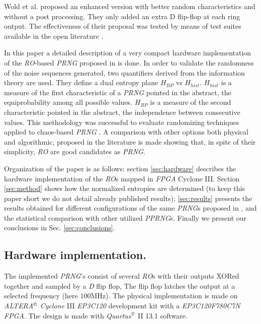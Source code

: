 Wold et al. \cite{Wold2009} proposed an enhanced version with
better random characteristics and without a post processing. They only
added an extra D flip-flop at each ring output. The
effectiveness of their proposal was tested by means of test suites available
in the open literature \cite{NIST2000,marsaglia1995,NIST2000a}.

In this paper a detailed description of a very compact hardware implementation of the \emph{RO}-based \emph{PRNG} proposed in \cite{Wold2009} is done.
In order to validate the randomness of the noise sequences generated, two quantifiers derived from the information theory are used. They define a dual entropy plane $H_{BP}$ vs $H_{hist}$.
$H_{hist}$ is a measure of the first characteristic of a \emph{PRNG} pointed in the abstract, the equiprobability among all possible values. $H_{BP}$ is a measure of the second characteristic pointed in the abstract, the independence between consecutive values. This methodology was successful to evaluate randomizing
techniques applied to chaos-based \emph{PRNG} \cite{DeMicco2008}. A comparison with other options both physical and algorithmic, proposed in the literature is made showing that, in spite of their simplicity, \emph{RO}  are good candidates as \emph{PRNG}.

Organization of the paper is as follows: section \ref{sec:hardware} describes the
hardware implementation of the \emph{RO}s mapped in
\emph{FPGA} Cyclone III. Section \ref{sec:method} shows how the normalized entropies are
determined (to keep this paper short we do not detail already
published results); \ref{sec:results} presents the
results obtained for different configurations of the same
\emph{PRNG}s proposed in \cite{Wold2009}, and the statistical comparison with other utilized \emph{PPRNG}s.
Finally we present our conclusions in Sec. \ref{sec:conclusions}.


\subsection{Hardware implementation.}

The implemented \emph{PRNG}'s consist of  several \emph{RO}s
with their outputs XORed together and sampled by a \emph{D} flip flop,
The flip flop latches the output at a selected frequency (here $100$MHz)\cite{Wold2009}.
The physical implementation is made on \emph{ALTERA}$^{\copyright}$  \emph{Cyclone} III \emph{EP3C120}
development kit with a \emph{EP3C120F780C7N} \emph{FPGA}. The design is made with \emph{Quartus}$^{\copyright}$  II 13.1 software.

